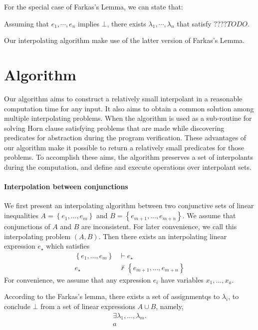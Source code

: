 \documentclass[master,final,12pt]{iscs-thesis}
\begin{document}
For the special case of Farkas's Lemma, we can state that:

Assuming that $e_1,\cdots,e_n$ implies $\bot$, there exists
$\lambda_1,\cdots,\lambda_n$ that satisfy $???? TODO $.

Our interpolating algorithm make use of the latter version of Farkas's
Lemma.


\section{Algorithm}

Our algorithm aims to construct a relatively small interpolant in a
reasonable computation time for any input.  It also aims to obtain a
common solution among multiple interpolating problems.  When the
algorithm is used as a sub-routine for solving Horn clause satisfying
problems that are made while discovering predicates for abstraction
during the program verification.  These advantages of our algorithm
make it possible to return a relatively small predicates for those
problems. To accomplish these aims, the algorithm preserves a set of
interpolants during the computation, and define and execute operations
over interpolant sets.


\paragraph{Interpolation between conjunctions}
We first present an interpolating algorithm between two conjunctive
sets of linear inequalities $A = \left\lbrace e_1,\ldots,e_m
\right\rbrace$ and $B = \left\lbrace e_{m+1},\ldots,e_{m+n}
\right\rbrace$.  We assume that conjunctions of $A$ and $B$ are
inconsistent.  For later convenience, we call this interpolating
problem $\left( A, B \right)$.  Then there exists an interpolating
linear expression $e_\star$ which satisfies
\begin{align*}
\left\lbrace e_1,\ldots,e_m \right\rbrace & \vdash e_\star \\
e_\star & \nvdash \left\lbrace e_{m+1},\ldots,e_{m+n} \right\rbrace
\end{align*}
For convenience, we assume that any expression $e_i$ have variables
$x_1, \ldots, x_a$.

According to the Farkas's lemma, there exists a set of assignmentqs to
$\lambda_i$, to conclude $\bot$ from a set of linear expressions $A
\cup B$, namely,
\begin{align*}
\exists \lambda_1, \ldots, \lambda_m. \\
a %
\end{align*}
\end{document}
